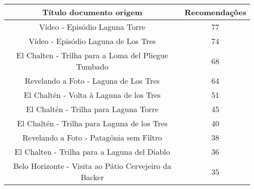 \begin{center}
    \begin{tabular}{|c|c|}
        \hline
        \textbf{Título documento origem} & \textbf{Recomendações} \\
        \hline
        Vídeo - Episódio Laguna Torre & 77 \\
        \hline
        Vídeo - Episódio Laguna de Los Tres & 74 \\
        \hline
        El Chalten - Trilha para a Loma del Pliegue Tumbado & 68 \\
        \hline
        Revelando a Foto - Laguna de Los Tres & 64 \\
        \hline
        El Chaltén - Volta à Laguna de los Tres & 51 \\
        \hline
        El Chaltén - Trilha para Laguna Torre & 45 \\
        \hline
        El Chaltén - Trilha para Laguna de los Tres & 40 \\
        \hline
        Revelando a Foto - Patagônia sem Filtro & 38 \\
        \hline
        El Chalten - Trilha para a Laguna del Diablo & 36 \\
        \hline
        Belo Horizonte - Visita ao Pátio Cervejeiro da Backer & 35 \\
        \hline
    \end{tabular}
\end{center}